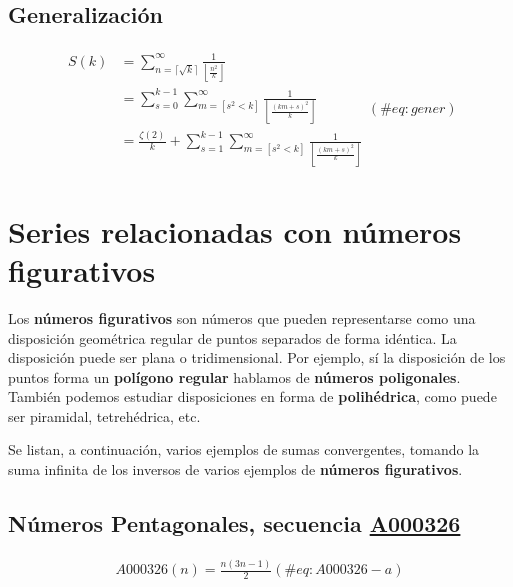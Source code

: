 \documentclass[
  letterpaper,
  DIV=11,
  numbers=noendperiod]{scrreprt}
\begin{document}
\hypertarget{generalizaciuxf3n}{%
\subsection{Generalización}\label{generalizaciuxf3n}}

\begin{multline}
\begin{split}
S(k) & =
\sum_{n=\lceil \sqrt{k} \rceil}^{\infty}{\frac{1}{\left\lfloor\frac{n^2}{k}\right\rfloor}} \\
& = \sum_{s=0}^{k-1}{\sum_{m=[{s}^{2} \lt k]}^{\infty}\frac{1}{\left\lfloor\frac{{(k m + s)}^{2}}{k}\right\rfloor}} \\

& = \frac{\zeta(2)}{k} + \sum_{s=1}^{k-1}{\sum_{m=[s^2 \lt k]}^{\infty}\frac{1}{\left\lfloor\frac{{(k m + s)}^{2}}{k}\right\rfloor}}
\end{split}
(\#eq:gener)
\end{multline}

\hypertarget{series-relacionadas-con-nuxfameros-figurativos}{%
\section{Series relacionadas con números
figurativos}\label{series-relacionadas-con-nuxfameros-figurativos}}

Los \textbf{números figurativos} son números que pueden representarse
como una disposición geométrica regular de puntos separados de forma
idéntica. La disposición puede ser plana o tridimensional. Por ejemplo,
sí la disposición de los puntos forma un \textbf{polígono regular}
hablamos de \textbf{números poligonales}. También podemos estudiar
disposiciones en forma de \textbf{polihédrica}, como puede ser
piramidal, tetrehédrica, etc.

Se listan, a continuación, varios ejemplos de sumas convergentes,
tomando la suma infinita de los inversos de varios ejemplos de
\textbf{números figurativos}.

\hypertarget{nuxfameros-pentagonales-secuencia-a000326}{%
\subsection{\texorpdfstring{Números Pentagonales, secuencia
\href{https://oeis.org/A000326}{A000326}}{Números Pentagonales, secuencia A000326}}\label{nuxfameros-pentagonales-secuencia-a000326}}

\begin{multline}
A000326(n) = \frac{n(3n-1)}{2}
  (\#eq:A000326-a)
\end{multline}
\end{document}
